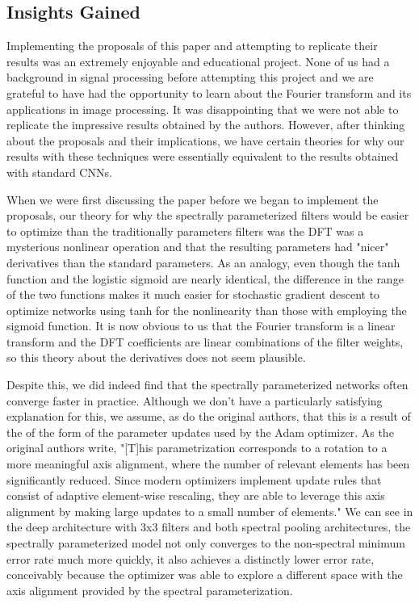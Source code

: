 \documentclass[10pt,journal,compsoc]{IEEEtran}
\begin{document}
\subsection{Insights Gained}

Implementing the proposals of this paper and attempting to replicate their results was an extremely enjoyable and educational project. None of us had a background in signal processing before attempting this project and we are grateful to have had the opportunity to learn about the Fourier transform and its applications in image processing. It was disappointing that we were not able to replicate the impressive results obtained by the authors. However, after thinking about the proposals and their implications, we have certain theories for why our results with these techniques were essentially equivalent to the results obtained with standard CNNs.

When we were first discussing the paper before we began to implement the proposals, our theory for why the spectrally parameterized filters would be easier to optimize than the traditionally parameters filters was the DFT was a mysterious nonlinear operation and that the resulting parameters had "nicer" derivatives than the standard parameters. As an analogy, even though the tanh function and the logistic sigmoid are nearly identical, the difference in the range of the two functions makes it much easier for stochastic gradient descent to optimize networks using tanh for the nonlinearity than those with employing the sigmoid function. It is now obvious to us that the Fourier transform is a linear transform and the DFT coefficients are linear combinations of the filter weights, so this theory about the derivatives does not seem plausible.

Despite this, we did indeed find that the spectrally parameterized networks often converge faster in practice. Although we don't have a particularly satisfying explanation for this, we assume, as do the original authors, that this is a result of the of the form of the parameter updates used by the Adam optimizer. As the original authors write, "[T]his parametrization corresponds to a rotation to a more meaningful axis alignment, where the number of relevant elements has been significantly reduced. Since modern optimizers implement update rules that consist of adaptive element-wise rescaling, they are able to leverage this axis alignment by making large updates to a small number of elements." We can see in the deep architecture with 3x3 filters and both spectral pooling architectures, the spectrally parameterized model not only converges to the non-spectral minimum error rate much more quickly, it also achieves a distinctly lower error rate, conceivably because the optimizer was able to explore a different space with the axis alignment provided by the spectral parameterization.
\end{document}
